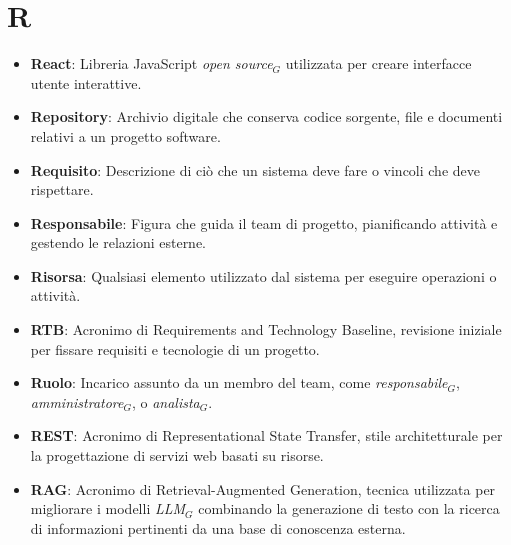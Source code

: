 \section{R}
\begin{itemize}
    \item \textbf{React}: Libreria JavaScript \textit{open source}$_G$ utilizzata per creare interfacce utente interattive.
    \item \textbf{Repository}: Archivio digitale che conserva codice sorgente, file e documenti relativi a un progetto software.
    \item \textbf{Requisito}: Descrizione di ciò che un sistema deve fare o vincoli che deve rispettare.
    \item \textbf{Responsabile}: Figura che guida il team di progetto, pianificando attività e gestendo le relazioni esterne.
    \item \textbf{Risorsa}: Qualsiasi elemento utilizzato dal sistema per eseguire operazioni o attività.
    \item \textbf{RTB}: Acronimo di Requirements and Technology Baseline, revisione iniziale per fissare requisiti e tecnologie di un progetto.
    \item \textbf{Ruolo}: Incarico assunto da un membro del team, come \textit{responsabile}$_G$, \textit{amministratore}$_G$, o \textit{analista}$_G$.
    \item \textbf{REST}: Acronimo di Representational State Transfer, stile architetturale per la progettazione di servizi web basati su risorse.
    \item \textbf{RAG}: Acronimo di Retrieval-Augmented Generation, tecnica utilizzata per migliorare i modelli \textit{LLM}$_G$ combinando la generazione di testo con la ricerca di informazioni pertinenti da una base di conoscenza esterna.
\end{itemize}
